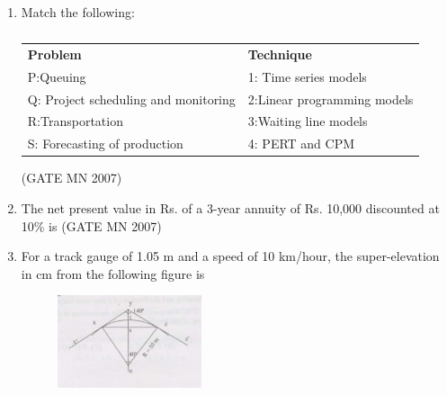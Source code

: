 \documentclass[journal]{IEEEtran}
\begin{document}
\begin{enumerate}
\item Match the following:\\
	\begin{table}[H]
    \centering\normalsize
\begin{tabular}{p{4.5cm} p{6cm}}                
\textbf{Problem} & \textbf{Technique}      \\                                              
P:Queuing & 1: Time series models \\            
Q: Project scheduling and monitoring & 2:Linear programming models \\  
R:Transportation & 3:Waiting line models \\     
S: Forecasting of production & 4: PERT and CPM \\
\end{tabular}
    \caption{}
    \label{tab:Q63}
\end{table}
	
\hfill (GATE MN 2007)
\begin{enumerate}
\end{enumerate}


\item The net present value in Rs. of a 3-year annuity of Rs. 10,000 discounted at 10\% is  
	\hfill (GATE MN 2007)
\begin{enumerate}
\end{enumerate}


\item For a track gauge of 1.05 m and a speed of 10 km/hour, the super-elevation in cm from the following figure is
	\begin{figure}[H]
    \centering
	\includegraphics[width=0.4\textwidth]{Screenshot_2025_0812_180648.png}
	\caption{}
    \label{fig:Q65}
\end{figure}


\end{enumerate}
\end{document}
